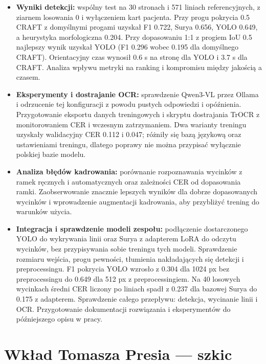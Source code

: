 \begin{itemize}
	\item \textbf{Wyniki detekcji:} wspólny test na 30 stronach i 571 liniach
	referencyjnych, z ziarnem losowania 0 i wyłączeniem kart pacjenta.
	Przy progu pokrycia 0.5 CRAFT z domyślnymi progami uzyskał F1 0.722,
	Surya 0.656, YOLO 0.649, a heurystyka morfologiczna 0.204.
	Przy dopasowaniu 1:1 z progiem IoU 0.5 najlepszy wynik uzyskał YOLO
	(F1 0.296 wobec 0.195 dla domyślnego CRAFT).
	Orientacyjny czas wynosił 0.6 s na stronę dla YOLO i 3.7 s dla CRAFT.
	Analiza wpływu metryki na ranking i kompromisu między jakością a czasem.

	\item \textbf{Eksperymenty i dostrajanie OCR:} sprawdzenie Qwen3-VL
	przez Ollama i odrzucenie tej konfiguracji z powodu pustych odpowiedzi
	i opóźnienia. Przygotowanie eksportu danych treningowych i skryptu
	dostrajania TrOCR z monitorowaniem CER i wczesnym zatrzymaniem.
	Dwa warianty treningu uzyskały walidacyjny CER 0.112 i 0.047;
	różniły się bazą językową oraz ustawieniami treningu, dlatego poprawy
	nie można przypisać wyłącznie polskiej bazie modelu.

	\item \textbf{Analiza błędów kadrowania:} porównanie rozpoznawania
	wycinków z ramek ręcznych i automatycznych oraz zależności CER
	od dopasowania ramki. Zaobserwowanie znacznie lepszych wyników dla
	dobrze dopasowanych wycinków i wprowadzenie augmentacji kadrowania,
	aby przybliżyć trening do warunków użycia.

	\item \textbf{Integracja i sprawdzenie modeli zespołu:} podłączenie
	dostarczonego YOLO do wykrywania linii oraz Surya z adapterem LoRA
	do odczytu wycinków, bez przypisywania sobie treningu tych modeli.
	Sprawdzenie rozmiaru wejścia, progu pewności, tłumienia nakładających
	się detekcji i preprocessingu. F1 pokrycia YOLO wzrosło z 0.304
	dla 1024 px bez preprocessingu do 0.649 dla 512 px z preprocessingiem.
	Na 40 losowych wycinkach średni CER liczony po liniach spadł z 0.237
	dla bazowej Surya do 0.175 z adapterem. Sprawdzenie całego przepływu:
	detekcja, wycinanie linii i OCR. Przygotowanie dokumentacji rozwiązania
	i eksperymentów do późniejszego opisu w pracy.
\end{itemize}

\section{Wkład Tomasza Presia --- szkic}

